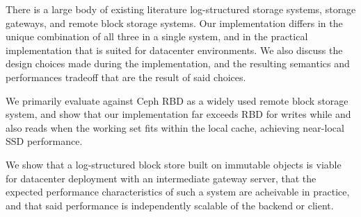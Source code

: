 There is a large body of existing literature log-structured storage systems,
storage gateways, and remote block storage systems. Our implementation differs
in the unique combination of all three in a single system, and in the practical
implementation that is suited for datacenter environments. We also discuss the
design choices made during the implementation, and the resulting semantics and
performances tradeoff that are the result of said choices.

We primarily evaluate against Ceph RBD as a widely used remote block storage
system, and show that our implementation far exceeds RBD for writes while
and also reads when the working set fits within the local cache, achieving
near-local SSD performance.

We show that a log-structured block store built on immutable objects is viable
for datacenter deployment with an intermediate gateway server, that the expected
performance characteristics of such a system are acheivable in practice, and
that said performance is independently scalable of the backend or client.
